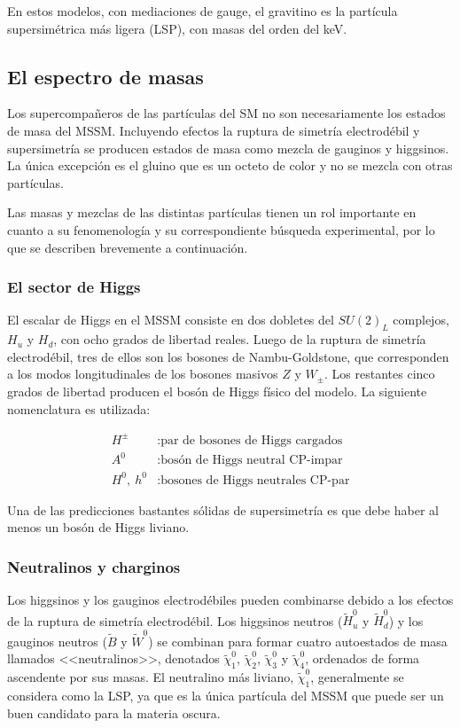 En estos modelos, con mediaciones de gauge, el gravitino es la partícula supersimétrica más ligera (LSP), con masas del orden del keV.

\subsection{El espectro de masas}

Los supercompañeros de las partículas del SM no son necesariamente los estados de masa del MSSM. Incluyendo efectos la ruptura de simetría electrodébil y supersimetría se producen estados de masa como mezcla de gauginos y higgsinos. La única excepción es el gluino que es un octeto de color y no se mezcla con otras partículas.

Las masas y mezclas de las distintas partículas tienen un rol importante en cuanto a su fenomenología y su correspondiente búsqueda experimental, por lo que se describen brevemente a continuación.


\subsubsection{El sector de Higgs} 

El escalar de Higgs en el MSSM consiste en dos dobletes del $SU(2)_{L}$ complejos, $H_{u}$ y $H_{d}$, con ocho grados de libertad reales. Luego de la ruptura de simetría electrodébil, tres de ellos son los bosones de Nambu-Goldstone, que corresponden a los modos longitudinales de los bosones masivos $Z$ y $W_{\pm}$. Los restantes cinco grados de libertad producen el bosón de Higgs físico del modelo. La siguiente nomenclatura es utilizada:

\begin{align*}
  H^{\pm} & : \text{par de bosones de Higgs cargados} \\
  A^{0} & : \text{bosón de Higgs neutral CP-impar} \\
  H^{0},\: h^{0} & : \text{bosones de Higgs neutrales CP-par} 
\end{align*}

Una de las predicciones bastantes sólidas de supersimetría es que debe haber al menos un bosón de Higgs liviano.


\subsubsection{Neutralinos y charginos}

Los higgsinos y los gauginos electrodébiles pueden combinarse debido a los efectos de la ruptura de simetría electrodébil. Los higgsinos neutros ($\widetilde{H}^{0}_{u}$ y $\widetilde{H}^{0}_{d}$) y los gauginos neutros ($\widetilde{B}$ y $\widetilde{W}^{0}$) se combinan para formar cuatro autoestados de masa llamados <<neutralinos>>, denotados $\widetilde{\chi}^{0}_{1}$, $\widetilde{\chi}^{0}_{2}$, $\widetilde{\chi}^{0}_{3}$ y $\widetilde{\chi}^{0}_{4}$, ordenados de forma ascendente por sus masas. El neutralino más liviano, $\widetilde{\chi}^{0}_{1}$, generalmente se considera como la LSP, ya que es la única partícula del MSSM que puede ser un buen candidato para la materia oscura. 

